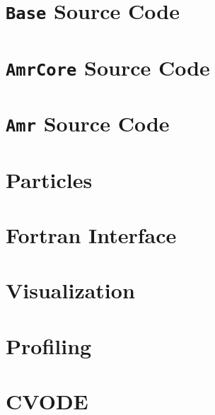 \documentclass[11pt]{book}
\makeatletter
\renewcommand*\cleardoublepage{\clearpage\if@twoside
\ifodd\c@page\else
\hbox{}
\thispagestyle{empty}
\newpage
\if@twocolumn\hbox{}\newpage\fi\fi\fi}
\makeatother
\begin{document}
\chapter{{\tt Base} Source Code}\label{Chap:Basics}


\chapter{{\tt AmrCore} Source Code}\label{Chap:AmrCore}


\chapter{{\tt Amr} Source Code}\label{Chap:AmrLevel}


\chapter{Particles}\label{Chap:Particles}


\chapter{Fortran Interface}\label{Chap:Fortran}


\chapter{Visualization}\label{Chap:Visualization}


\chapter{Profiling}\label{Chap:Profiling}


%

\chapter{CVODE}\label{Chap:CVODE}


\backmatter

% 
% 

\end{document}
